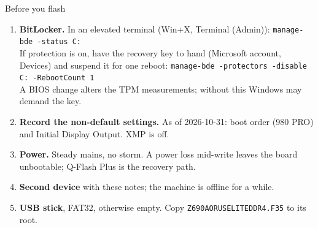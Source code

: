 \documentclass[aspectratio=169,11pt]{beamer}
\begin{document}
\begin{frame}{Before you flash}
  \footnotesize
  \begin{enumerate}\setlength{\itemsep}{0.15em}
    \item \textbf{BitLocker.} In an elevated terminal (Win+X, Terminal (Admin)):
      \texttt{manage-bde -status C:}\\
      If protection is on, have the recovery key to hand (Microsoft account, Devices) and suspend
      it for one reboot: \texttt{manage-bde -protectors -disable C: -RebootCount 1}\\
      A BIOS change alters the TPM measurements; without this Windows may demand the key.
    \item \textbf{Record the non-default settings.} As of 2026-10-31: boot order (980 PRO) and
      Initial Display Output. XMP is off.
    \item \textbf{Power.} Steady mains, no storm. A power loss mid-write leaves the board
      unbootable; Q-Flash Plus is the recovery path.
    \item \textbf{Second device} with these notes; the machine is offline for a while.
    \item \textbf{USB stick}, FAT32, otherwise empty. Copy \texttt{Z690AORUSELITEDDR4.F35} to its root.
  \end{enumerate}
\end{frame}
\end{document}
